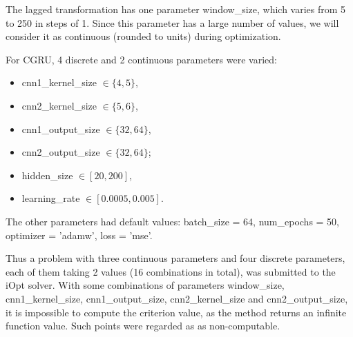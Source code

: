 \documentclass[runningheads]{llncs}
\begin{document}
The lagged transformation has one parameter window\_size, which varies from 5 to 250 in steps of 1. Since this parameter has a large number of values, we will consider it as continuous (rounded to units) during optimization.

For CGRU, 4 discrete and 2 continuous parameters were varied:
\begin{itemize}
\item cnn1\_kernel\_size $\in \{4, 5\}$,
\item cnn2\_kernel\_size $\in \{5, 6\}$, 
\item cnn1\_output\_size $\in \{32, 64\}$, 
\item cnn2\_output\_size $\in \{32, 64\}$;
\item hidden\_size $\in [20, 200]$, 
\item learning\_rate $\in [0.0005, 0.005]$.
\end{itemize}

The other parameters had default values: batch\_size = 64, num\_epochs = 50, optimizer = 'adamw', loss = 'mse'.

Thus a problem with three continuous parameters and four discrete parameters,  each of them taking  2 values (16 combinations in total), was submitted to the iOpt solver. With some combinations of parameters window\_size, cnn1\_kernel\_size, cnn1\_output\_size, cnn2\_kernel\_size and cnn2\_output\_size, it is impossible to compute the criterion value, as the method returns an infinite function value. Such points were regarded as as non-computable.
\end{document}

